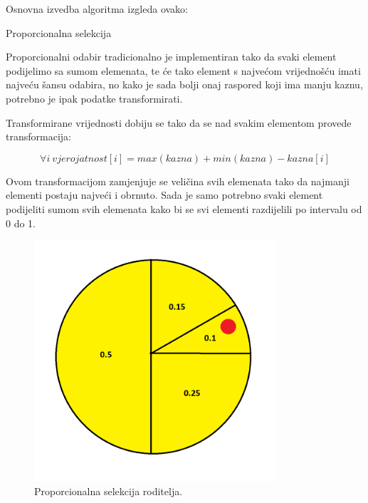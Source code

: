 \documentclass[times, utf8, zavrsni]{fer}
\begin{document}
Osnovna izvedba algoritma izgleda ovako:
\newpage
\begin{algorithm}
\caption{Proporcionalna selekcija}
\label{algo:proporcionalno}
\begin{algorithmic}
\STATE{}
\ENDFOR
{}
\ENDFOR
\STATE{}
\ENDIF
\ENDFOR
\end{algorithmic}
\end{algorithm}

Proporcionalni odabir tradicionalno je implementiran tako da svaki element podijelimo sa sumom elemenata, te će tako element s najvećom vrijednošću imati najveću šansu odabira, no kako je sada bolji onaj raspored koji ima manju kaznu, potrebno je ipak podatke transformirati.

Transformirane vrijednosti dobiju se tako da se nad svakim elementom provede transformacija:

\begin{equation}
\forall i\ vjerojatnost[i] = max(kazna) + min(kazna) - kazna[i]
\label{eq:trans-kazne}
\end{equation}

Ovom transformacijom zamjenjuje se veličina svih elemenata tako da najmanji elementi postaju najveći i obrnuto. Sada je samo potrebno svaki element podijeliti sumom svih elemenata kako bi se svi elementi razdijelili po intervalu od 0 do 1.

\begin{figure}[htb]
\centering
\includegraphics[width=9cm]{images/rulet.png}
\caption{Proporcionalna selekcija roditelja.}
\label{fig:rulet}
\end{figure}
\end{document}
